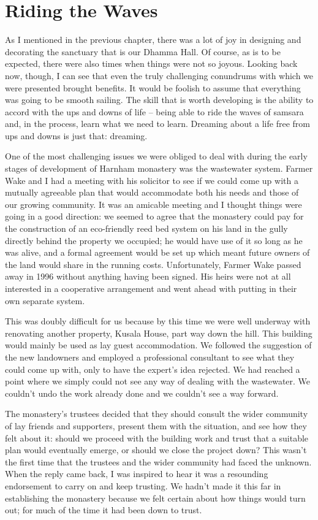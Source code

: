 \chapter{Riding the Waves}

As I mentioned in the previous chapter, there was a lot of joy in
designing and decorating the sanctuary that is our Dhamma Hall. Of
course, as is to be expected, there were also times when things were not
so joyous. Looking back now, though, I can see that even the truly
challenging conundrums with which we were presented brought benefits. It
would be foolish to assume that everything was going to be smooth
sailing. The skill that is worth developing is the ability to accord
with the ups and downs of life -- being able to ride the waves of
samsara and, in the process, learn what we need to learn. Dreaming about
a life free from ups and downs is just that: dreaming.

One of the most challenging issues we were obliged to deal with during
the early stages of development of Harnham monastery was the wastewater
system. Farmer Wake and I had a meeting with his solicitor to see if we
could come up with a mutually agreeable plan that would accommodate both
his needs and those of our growing community. It was an amicable meeting
and I thought things were going in a good direction: we seemed to agree
that the monastery could pay for the construction of an eco-friendly
reed bed system on his land in the gully directly behind the property we
occupied; he would have use of it so long as he was alive, and a formal
agreement would be set up which meant future owners of the land would
share in the running costs. Unfortunately, Farmer Wake passed away in
1996 without anything having been signed. His heirs were not at all
interested in a cooperative arrangement and went ahead with putting in
their own separate system.

This was doubly difficult for us because by this time we were well
underway with renovating another property, Kusala House, part way down
the hill. This building would mainly be used as lay guest accommodation.
We followed the suggestion of the new landowners and employed a
professional consultant to see what they could come up with, only to
have the expert's idea rejected. We had reached a point where we simply
could not see any way of dealing with the wastewater. We couldn't undo
the work already done and we couldn't see a way forward.

The monastery's trustees decided that they should consult the wider
community of lay friends and supporters, present them with the
situation, and see how they felt about it: should we proceed with the
building work and trust that a suitable plan would eventually emerge, or
should we close the project down? This wasn't the first time that the
trustees and the wider community had faced the unknown. When the reply
came back, I was inspired to hear it was a resounding endorsement to
carry on and keep trusting. We hadn't made it this far in establishing
the monastery because we felt certain about how things would turn out;
for much of the time it had been down to trust.

